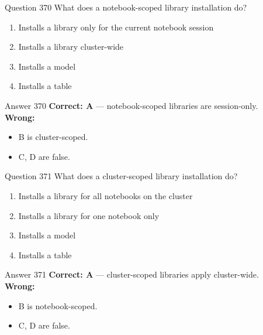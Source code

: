 \documentclass[aspectratio=169,11pt]{beamer}
\begin{document}
	\begin{frame}{Question 370}
		What does a notebook-scoped library installation do?
		\begin{enumerate}[label=\Alph*.]
			\item Installs a library only for the current notebook session
			\item Installs a library cluster-wide
			\item Installs a model
			\item Installs a table
		\end{enumerate}
	\end{frame}
	\begin{frame}{Answer 370}
		\textbf{Correct: A} --- notebook-scoped libraries are session-only.\\
		\vspace{0.5em}
		\textbf{Wrong:}
		\begin{itemize}
			\item B is cluster-scoped.
			\item C, D are false.
		\end{itemize}
	\end{frame}
	
	\begin{frame}{Question 371}
		What does a cluster-scoped library installation do?
		\begin{enumerate}[label=\Alph*.]
			\item Installs a library for all notebooks on the cluster
			\item Installs a library for one notebook only
			\item Installs a model
			\item Installs a table
		\end{enumerate}
	\end{frame}
	\begin{frame}{Answer 371}
		\textbf{Correct: A} --- cluster-scoped libraries apply cluster-wide.\\
		\vspace{0.5em}
		\textbf{Wrong:}
		\begin{itemize}
			\item B is notebook-scoped.
			\item C, D are false.
		\end{itemize}
	\end{frame}
	
\end{document}

